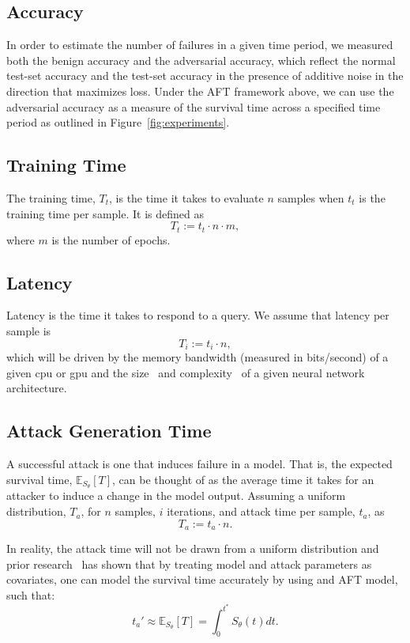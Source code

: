\documentclass[sn-mathphys-num]{sn-jnl}%
\begin{document}
\subsection{Accuracy}

In order to estimate the number of failures in a given time period, we measured both the benign accuracy and the adversarial accuracy, which reflect the normal test-set accuracy and the test-set accuracy in the presence of additive noise in the direction that maximizes loss. Under the AFT framework above, we can use the adversarial accuracy as a measure of the survival time across a specified time period as outlined in Figure~\ref{fig:experiments}.


\subsection{Training Time}

The training time, $T_t$, is the time it takes to evaluate $n$ samples when $t_t$ is the training time per sample. It is defined as
\[
    T_t := t_t \cdot n  \cdot m,
\]
where $m$ is the number of epochs.


\subsection{Latency}

Latency is the time it takes to respond to a query. We assume that latency per sample is
\[
    T_i := t_i \cdot n,
\]
which will be driven by the memory bandwidth (measured in bits/second) of a given \acrshort{cpu} or \acrshort{gpu} and the size~\cite{vgg} and complexity~\cite{resnet} of a given neural network architecture.


\subsection{Attack Generation Time}
A successful attack is one that induces failure in a model. That is, the expected survival time, $\mathbb{E}_{S_\theta}[T]$, can be thought of as the average time it takes for an attacker to induce a change in the model output. Assuming a uniform distribution, $T_a$, for $n$ samples, $i$ iterations, and attack time per sample, $t_a$, as
\begin{equation}
    T_a := t_a \cdot n.
    \label{eq:attack_time}
\end{equation}

In reality, the attack time will not be drawn from a uniform distribution and prior research~\cite{meyers_aft} has shown that by treating model and attack parameters as covariates, one can model the survival time accurately by using and AFT model, such that:
\begin{equation}
	t_{a}' \approx \mathbb{E}_{S_\theta}[T] =  \int_{0}^{t^*} S_{\theta}(t) dt.
    \label{eq:aft_time}
\end{equation}
\end{document}
